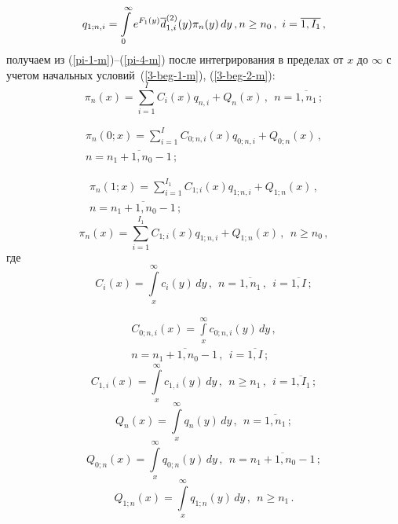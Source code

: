 \begin{multicols}{2}
\vspace*{-12pt}

\noindent
\begin{equation*}
q_{1;n,i} = \int\limits_0^\infty e^{F_{1}(y)}  \overline d^{(2)}_{1,i}(y) \pi_n(y)\, dy\,,\\ 
n\ge n_0\,,\  i=\overline{1,I_1}\,,
\end{equation*}
получаем из (\ref{pi-1-m})--(\ref{pi-4-m}) после
интегрирования в пределах от $x$ до $\infty$
с учетом начальных условий~(\ref{3-beg-1-m}),
(\ref{3-beg-2-m}):
\begin{equation}
\label{ipi-1-m}
\pi_n(x)= \sum\limits_{i=1}^{I} C_i(x) q_{n,i}+Q_{n}(x) \,,
\ \ n=\overline{1,n_1}\,;
\end{equation}

\vspace*{-24pt}

\noindent
\begin{multline}
\label{ipi-2-m}
\pi_n(0;x) = \sum\limits_{i=1}^{I} C_{0;n,i}(x) q_{0;n,i} +
Q_{0;n}(x) \,, \\[1pt]
 n=\overline{n_1+1,n_0-1}\,;
\end{multline}

\vspace*{-12pt}

\noindent
\begin{multline}
\label{ipi-3-m}
\pi_n(1;x) = \sum\limits_{i=1}^{I_1} C_{1;i}(x) q_{1;n,i} +
Q_{1;n}(x)\,, \\[1pt] 
n=\overline{n_1+1,n_0-1}\,;
\end{multline}
\begin{equation}
\label{ipi-4-m}
\pi_n(x)= \sum\limits_{i=1}^{I_1} C_{1;i}(x) q_{1;n,i} +
Q_{1;n}(x)\,, \ \ n\ge n_0\,,
\end{equation}
где
$$
C_{i}(x)= \int\limits_x^\infty c_{i}(y)\, dy\,, \ \ n=\overline{1,n_1}\,,\ \ i=\overline{1,I}\,;
$$

\vspace*{-12pt}

\noindent
\begin{multline*}
C_{0;n,i}(x)= \int\limits_x^\infty c_{0;n,i}(y)\, dy\,, \\ 
n=\overline{n_1+1,n_0-1}\,,\ \ i=\overline{1,I}\,;
\end{multline*}
$$
C_{1,i}(x) = \int\limits_x^\infty c_{1,i}(y)\, dy\,,
\ \ n\ge n_1\,,\ \ i=\overline{1,I_1}\,;
$$
$$
Q_{n}(x) = \int\limits_x^\infty q_{n}(y)\, dy\,,
\ \ n=\overline{1,n_1}\,;
$$
$$
Q_{0;n}(x)= \int\limits_x^\infty q_{0;n}(y)\, dy\,,
\ \ n=\overline{n_1+1,n_0-1}\,;
$$
$$
Q_{1;n}(x)= \int\limits_x^\infty q_{1;n}(y)\, dy\,,
\ \ n\ge n_1\,.
$$


\end{multicols}
